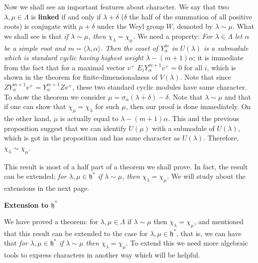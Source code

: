 \documentclass{article}
\newcommand{\lie}[1]{\mathfrak{#1}}
\begin{document}
Now we shall see an important features about character.
We say that two $\lambda, \mu \in \Lambda$ is \textbf{linked} if and only if $\lambda + \delta$ ($\delta$ the half of the summation of all positive roots) is conjugate with $\mu + \delta$ under the Weyl group $W$, demoted by $\lambda \sim \mu$.
What we shall see is that \textit{if $\lambda \sim \mu$, then $\chi_\lambda = \chi_\mu$.}
We need a property: \textit{For $\lambda \in \Lambda$ let $\alpha$ be a simple root and $m = \langle \lambda, \alpha \rangle$.
Then the coset of $Y_\alpha^m$ in $U(\lambda)$ is a submodule which is standard cyclic having highest weight $\lambda - (m + 1)\alpha$}; it is immediate from the fact that for a maximal vector $v^+$ $E_i Y_\alpha^{m + 1} v^+ =0$ for all $i$, which is shown in the theorem for finite-dimensionalness of $V(\lambda)$.
Note that since $Z Y_\alpha^{m + 1} v^+ = Y_\alpha^{m + 1} Zv^+$, these two standard cyclic modules have same character.
To show the theorem we consider $\mu = \sigma_\alpha(\lambda + \delta) - \delta$.
Note that $\lambda \sim \mu$ and that if one can show that $\chi_\mu = \chi_\lambda$ for such $\mu$, then our proof is done immediately.
On the other hand, $\mu$ is actually equal to $\lambda - (m + 1)\alpha$.
This and the previous proposition suggest that we can identify $U(\mu)$ with a submodule of $U(\lambda)$, which is got in the proposition and has same character as $U(\lambda)$.
Therefore, $\chi_\lambda \sim \chi_\mu$.

This result is most of a half part of a theorem we shall prove.
In fact, the result can be extended; \textit{for $\lambda, \mu \in \lie{h}^*$ if $\lambda \sim \mu$, then $\chi_\lambda = \chi_\mu$.}
We will study about the extensions in the next page.

\newpage

\textbf{Extension to $\lie{h}^*$}

We have proved a theorem: for $\lambda, \mu \in \Lambda$ if $\lambda \sim \mu$ then $\chi_\lambda = \chi_\mu$, and mentioned that this result can be extended to the case for $\lambda, \mu \in \lie{h}^*$, that is, we can have that \textit{for $\lambda, \mu \in \lie{h}^*$ if $\lambda \sim \mu$ then $\chi_\lambda = \chi_\mu$}.
To extend this we need more algebraic tools to express characters in another way which will be helpful.
\end{document}
